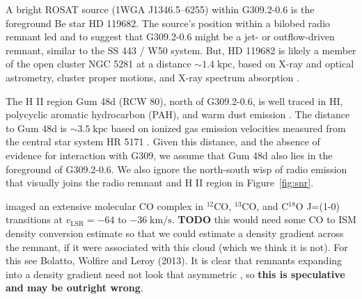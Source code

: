 \documentclass[preprint2,tighten,trackchanges]{aastex6}
\newcommand*{\mt}{\mathrm}
\newcommand*{\unit}[1]{\;\mt{#1}}  %
\newcommand*{\abt}{\mathord{\sim}} %
\newcommand*{\nH}{N_{\mathrm{H}}}
\begin{document}
A bright ROSAT source (1WGA J1346.5--6255) within G309.2-0.6 is the foreground
Be star HD 119682.
The source's position within a bilobed radio remnant led
 and  to suggest that
G309.2-0.6 might be a jet- or outflow-driven remnant, similar to the SS 443 /
W50 system.
But, HD 119682 is likely a member of the open cluster NGC 5281 at a distance
$\abt 1.4 \unit{kpc}$, based on X-ray and optical astrometry, cluster proper
motions, and X-ray spectrum absorption \citep{rakowski2006, safi-harb2007,
torrejon2013}.

The H II region Gum 48d (RCW 80), north of G309.2-0.6, is well traced in HI,
polycyclic aromatic hydrocarbon (PAH), and warm dust emission
\citep{karr2009}.
The distance to Gum 48d is $\abt 3.5\unit{kpc}$ based on ionized gas emission
velocities measured from the central star system HR 5171 \citep{karr2009}.
Given this distance, and the absence of evidence for interaction with G309,
we assume that Gum 48d also lies in the foreground of G309.2-0.6.
We also ignore the north-south wisp of radio emission that visually joins the
radio remnant and H II region in Figure~\ref{fig:snr}.

\citet{saito2001} imaged
an extensive molecular CO complex in ${}^{12}$CO, ${}^{13}$CO, and C${}^{18}$O
J=(1-0) transitions at $v_\mt{LSR} = -64$ to $-36 \unit{km/s}$.
\textbf{TODO} this would need some CO to ISM density conversion estimate so
that we could estimate a density gradient across the remnant, if it were
associated with this cloud (which we think it is not).
For this see Bolatto, Wolfire and Leroy (2013).
It is clear that remnants expanding into a density gradient need not look that
asymmetric \citep{williams2013}, so \textbf{this is speculative and may be
outright wrong}.


\end{document}
